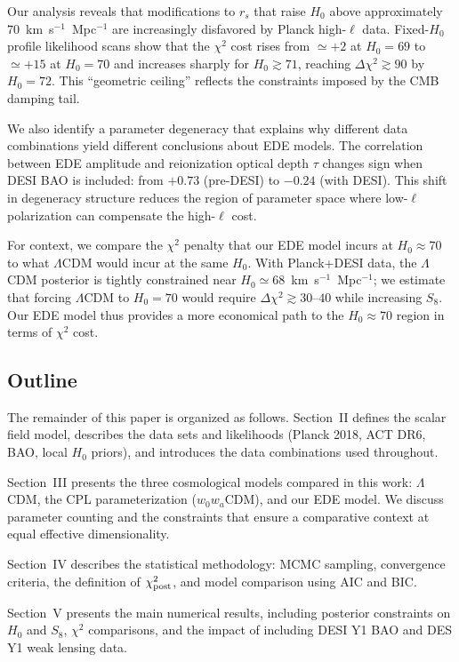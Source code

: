 \documentclass[a4paper,11pt]{article}
\begin{document}
Our analysis reveals that modifications to $r_s$ that raise $H_0$ above approximately $70$~km~s$^{-1}$~Mpc$^{-1}$ are increasingly disfavored by Planck high-$\ell$ data. Fixed-$H_0$ profile likelihood scans show that the $\chi^2$ cost rises from $\simeq +2$ at $H_0 = 69$ to $\simeq +15$ at $H_0 = 70$ and increases sharply for $H_0 \gtrsim 71$, reaching $\Delta\chi^2 \gtrsim 90$ by $H_0 = 72$. This ``geometric ceiling'' reflects the constraints imposed by the CMB damping tail.

We also identify a parameter degeneracy that explains why different data combinations yield different conclusions about EDE models. The correlation between EDE amplitude and reionization optical depth $\tau$ changes sign when DESI BAO is included: from $+0.73$ (pre-DESI) to $-0.24$ (with DESI). This shift in degeneracy structure reduces the region of parameter space where low-$\ell$ polarization can compensate the high-$\ell$ cost.

For context, we compare the $\chi^2$ penalty that our EDE model incurs at $H_0 \approx 70$ to what $\Lambda$CDM would incur at the same $H_0$. With Planck+DESI data, the $\Lambda$CDM posterior is tightly constrained near $H_0 \simeq 68$~km~s$^{-1}$~Mpc$^{-1}$; we estimate that forcing $\Lambda$CDM to $H_0 = 70$ would require $\Delta\chi^2 \gtrsim 30$--$40$ while increasing $S_8$. Our EDE model thus provides a more economical path to the $H_0 \approx 70$ region in terms of $\chi^2$ cost.

\subsection{Outline}

The remainder of this paper is organized as follows. Section~II defines the scalar field model, describes the data sets and likelihoods (Planck 2018, ACT DR6, BAO, local $H_0$ priors), and introduces the data combinations used throughout.

Section~III presents the three cosmological models compared in this work: $\Lambda$CDM, the CPL parameterization ($w_0w_a$CDM), and our EDE model. We discuss parameter counting and the constraints that ensure a comparative context at equal effective dimensionality.

Section~IV describes the statistical methodology: MCMC sampling, convergence criteria, the definition of $\chi^2_{\rm post}$, and model comparison using AIC and BIC.

Section~V presents the main numerical results, including posterior constraints on $H_0$ and $S_8$, $\chi^2$ comparisons, and the impact of including DESI Y1 BAO and DES Y1 weak lensing data.
\end{document}
